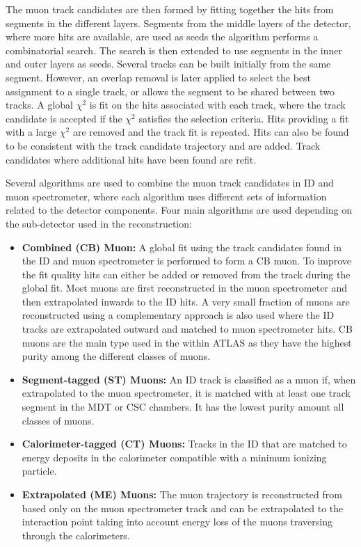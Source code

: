 The muon track candidates are then formed by fitting together the hits from segments in the different layers. Segments from the middle layers of the detector, where more hits are available, are used as seeds the algorithm performs a combinatorial search. The search is then extended to use segments in the inner and outer layers as seeds. Several tracks can be built initially from the same segment. However, an overlap removal is later applied to select the best assignment to a single track, or allows the segment to be shared between two tracks. A global $\chi^2$ is fit on the hits associated with each track, where the track candidate is accepted if the $\chi^2$ satisfies the selection criteria. Hits providing a fit with a large $\chi^2$ are removed and the track fit is repeated. Hits can also be found to be consistent with the track candidate trajectory and are added. Track candidates where additional hits have been found are refit. 

Several algorithms are used to combine the muon track candidates in ID and muon spectrometer, where each algorithm uses different sets of information related to the detector components. Four main algorithms are used depending on the sub-detector used in the reconstruction:
\begin{itemize}
    \item \textbf{Combined (CB) Muon:} A global fit using the track candidates found in the ID and muon spectrometer is performed to form a CB muon. To improve the fit quality hits can either be added or removed from the track during the global fit. Most muons are first reconstructed in the muon spectrometer and then extrapolated inwards to the ID hits. A very small fraction of muons are reconstructed using a complementary approach is also used where the ID tracks are extrapolated outward and matched to muon spectrometer hits. CB muons are the main type used in the within ATLAS as they have the highest purity among the different classes of muons.
    \item \textbf{Segment-tagged (ST) Muons:}  An ID track is classified as a muon if, when extrapolated to the muon spectrometer, it is matched with at least one track segment in the MDT or CSC chambers. It has the lowest purity amount all classes of muons.
    \item \textbf{Calorimeter-tagged (CT) Muons:} Tracks in the ID that are matched to energy deposits in the calorimeter compatible with a minimum ionizing particle. 
    \item \textbf{Extrapolated (ME) Muons:} The muon trajectory is reconstructed from based only on the muon spectrometer track and can be extrapolated to the interaction point taking into account energy loss of the muons traversing through the calorimeters. 
\end{itemize}

